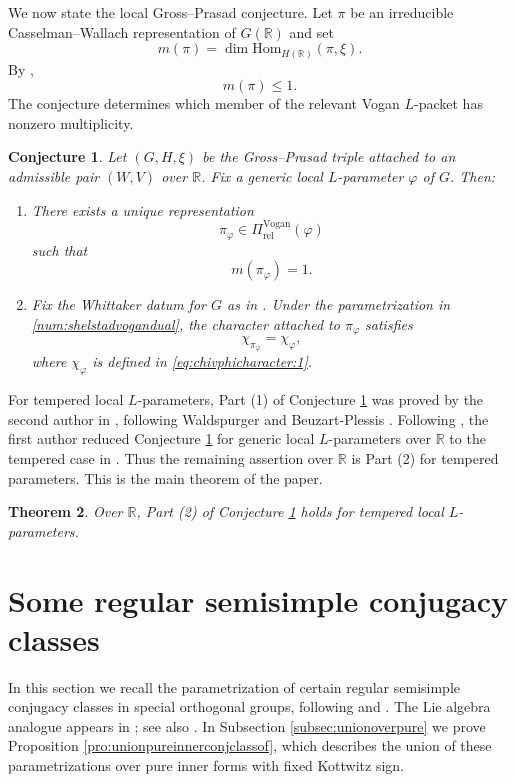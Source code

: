 \documentclass[12pt]{amsart}
\numberwithin{equation}{subsection}
\newcommand{\BR}{{\mathbb {R}}}
\newcommand{\Hom}{{\mathrm{Hom}}}
\def\vphi{\varphi}
\def\Vg{\mathrm{Vogan}}
\def\rel{\mathrm{rel}}
\newtheorem{thm}{Theorem}[subsection]
\newtheorem{conjec}[thm]{Conjecture}
\begin{document}
We now state the local Gross--Prasad conjecture. Let $\pi$ be an irreducible
Casselman--Wallach representation of $G(\BR)$ and set
\begin{equation}\label{eq:multiplicity}
m(\pi)=\dim \Hom_{H(\BR)}(\pi,\xi).
\end{equation}
By \cite{szmut1,MR2720228},
\[
m(\pi)\leq 1.
\]
The conjecture determines which member of the relevant Vogan $L$-packet has
nonzero multiplicity.

\begin{conjec}\label{conjec:gp}
Let $(G,H,\xi)$ be the Gross--Prasad triple attached to an admissible pair
$(W,V)$ over $\BR$. Fix a generic local $L$-parameter $\vphi$ of $G$. Then:

\begin{enumerate}
\item
There exists a unique representation
\[
\pi_\vphi\in \Pi^\Vg_{\rel}(\vphi)
\]
such that
\[
m(\pi_\vphi)=1.
\]

\item
Fix the Whittaker datum for $G$ as in \cite[(6.3)]{MR1295124}. Under the
parametrization in \ref{num:shelstadvogandual}, the character attached to
$\pi_\vphi$ satisfies
\[
\chi_{\pi_\vphi}=\chi_\vphi,
\]
where $\chi_\vphi$ is defined in \eqref{eq:chivphicharacter:1}.
\end{enumerate}
\end{conjec}

For tempered local $L$-parameters, Part (1) of Conjecture \ref{conjec:gp} was
proved by the second author in \cite{thesis_zhilin}, following Waldspurger
\cite{waldspurger10,MR3155345} and Beuzart-Plessis
\cite{beuzart2015local}. Following \cite{MR3155346}, the first author reduced
Conjecture \ref{conjec:gp} for generic local $L$-parameters over $\BR$ to the
tempered case in \cite{chen2021local}. Thus the remaining assertion over
$\BR$ is Part (2) for tempered parameters. This is the main theorem of the
paper.

\begin{thm}\label{thm:main}
Over $\BR$, Part (2) of Conjecture \ref{conjec:gp} holds for tempered local
$L$-parameters.
\end{thm}



\section{Some regular semisimple conjugacy classes}\label{sec:regconj}

In this section we recall the parametrization of certain regular semisimple conjugacy classes in special orthogonal groups, following
\cite[\S 1.3]{MR2672539} and \cite[\S 1.3, \S 1.4]{MR3155345}. The Lie
algebra analogue appears in \cite{wald01nilpotent}; see also
\cite[\S 5.1]{thesis_zhilin}. In Subsection \ref{subsec:unionoverpure} we
prove Proposition \ref{pro:unionpureinnerconjclassof}, which describes the
union of these parametrizations over pure inner forms with fixed Kottwitz sign.
\end{document}
